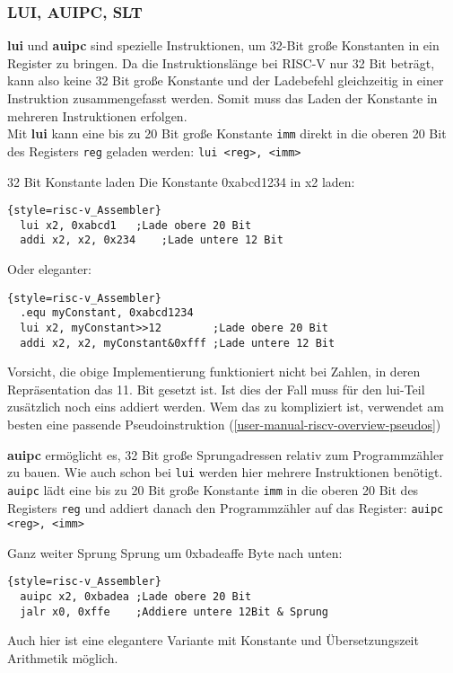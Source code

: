 {\subsubsection{LUI, AUIPC, SLT}
\textbf{lui} und \textbf{auipc} sind spezielle Instruktionen, um 32-Bit große Konstanten in ein Register zu bringen. Da die Instruktionslänge bei RISC-V nur 32 Bit beträgt, kann also keine 32 Bit große Konstante und der Ladebefehl gleichzeitig in einer Instruktion zusammengefasst werden. Somit muss das Laden der Konstante in mehreren Instruktionen erfolgen.\\

Mit \textbf{lui} kann eine bis zu 20 Bit große Konstante \texttt{imm} direkt in die oberen 20 Bit des Registers \texttt{reg} geladen werden:
\texttt{lui <reg>, <imm>}
\begin{exampleblock}{32 Bit Konstante laden}
Die Konstante 0xabcd1234 in x2 laden:\\
\begin{lstlisting}{style=risc-v_Assembler}
  lui x2, 0xabcd1 	;Lade obere 20 Bit
  addi x2, x2, 0x234	;Lade untere 12 Bit
\end{lstlisting}
Oder eleganter:
\begin{lstlisting}{style=risc-v_Assembler}	
  .equ myConstant, 0xabcd1234
  lui x2, myConstant>>12        ;Lade obere 20 Bit
  addi x2, x2, myConstant&0xfff ;Lade untere 12 Bit
\end{lstlisting}
Vorsicht, die obige Implementierung funktioniert nicht bei Zahlen, in deren Repräsentation das 11. Bit gesetzt ist. Ist dies der Fall muss für den lui-Teil zusätzlich noch eins addiert werden. Wem das zu kompliziert ist, verwendet am besten eine passende Pseudoinstruktion (\autoref{user-manual-riscv-overview-pseudos})
\end{exampleblock}
\textbf{auipc} ermöglicht es, 32 Bit große Sprungadressen relativ zum Programmzähler zu bauen. Wie auch schon bei \texttt{lui} werden hier mehrere Instruktionen benötigt. \texttt{auipc} lädt eine bis zu 20 Bit große Konstante \texttt{imm} in die oberen 20 Bit des Registers \texttt{reg} und addiert danach den Programmzähler auf das Register:
\texttt{auipc <reg>, <imm>}
\begin{exampleblock}{Ganz weiter Sprung}
Sprung um 0xbadeaffe Byte nach unten:
\begin{lstlisting}{style=risc-v_Assembler}
  auipc x2, 0xbadea	;Lade obere 20 Bit
  jalr x0, 0xffe	;Addiere untere 12Bit & Sprung
\end{lstlisting}
Auch hier ist eine elegantere Variante mit Konstante und Übersetzungszeit Arithmetik möglich.
\end{exampleblock}

}
